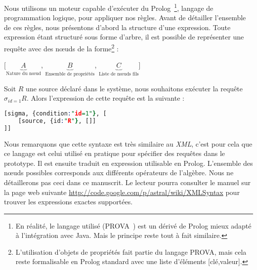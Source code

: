 Nous utilisons un moteur capable d'exécuter du Prolog~\footnote{En réalité, le langage utilisé (PROVA~\cite{Kozlenkov:prova}) est un dérivé de Prolog mieux adapté à l'intégration avec Java. Mais le principe reste tout à fait similaire.}, langage de programmation logique, pour appliquer nos règles. Avant de détailler l'ensemble de ces règles, nous présentons d'abord la structure d'une expression. Toute expression étant structuré sous forme d'arbre, il est possible de représenter une requête avec des nœuds de la forme\footnote{L'utilisation d'objets de propriétés fait partie du langage PROVA, mais cela reste formalisable en Prolog standard avec une liste d'éléments [clé,valeur].} :
\begin{center} [$\underbrace{A}_{\textrm{Nature du nœud}}$, $\underbrace{B}_{\textrm{Ensemble de propriétés}}$, $\underbrace{C}_{\textrm{Liste de nœuds fils}}$] \end{center}
\begin{example}
	Soit $R$ une source déclaré dans le système, nous souhaitons exécuter la requête $\sigma_{id=1} R$. Alors l'expression de cette requête est la suivante :
	\begin{lstlisting}[language=Prolog]
[sigma,	{condition:"id=1"}, [
	[source, {id:"R"}, []]
]]
	\end{lstlisting}
\end{example}
Nous remarquons que cette syntaxe est très similaire au \textit{XML}, c'est pour cela que ce langage est celui utilisé en pratique pour spécifier des requêtes dans le prototype. Il est ensuite traduit en expression utilisable en Prolog. L'ensemble des nœuds possibles corresponds aux différents opérateurs de l'algèbre. Nous ne détaillerons pas ceci dans ce manuscrit. Le lecteur pourra consulter le manuel sur la page web suivante \url{http://code.google.com/p/astral/wiki/XMLSyntax} pour trouver les expressions exactes supportées.